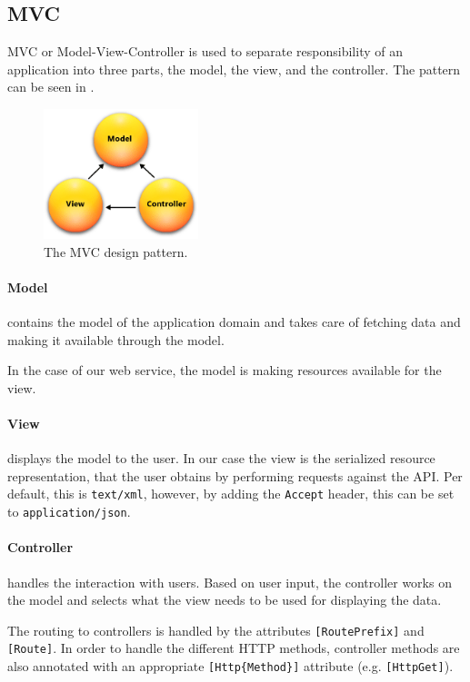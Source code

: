 \subsection{MVC} 
MVC or Model-View-Controller\cite{aspmvc} is used to separate responsibility of an application into three parts, the model, the view, and the controller.
The pattern can be seen in .

\begin{figure}[h]
\center
\includegraphics[width=0.4\textwidth]{graphics/mvc}
\caption{The MVC design pattern.\cite{aspmvc}}
\label{mvcdiagram}
\end{figure}

\paragraph{Model} contains the model of the application domain and takes care of fetching data and making it available through the model.

In the case of our web service, the model is making resources available for the view.

\paragraph{View} displays the model to the user.
In our case the view is the serialized resource representation, that the user obtains by performing requests against the API.
Per default, this is \texttt{text/xml}, however, by adding the \texttt{Accept} header, this can be set to \texttt{application/json}.\cite[Section 14]{http_specification}

\paragraph{Controller} handles the interaction with users.
Based on user input, the controller works on the model and selects what the view needs to be used for displaying the data.

The routing to controllers is handled by the attributes \texttt{[RoutePrefix]} and \texttt{[Route]}.
In order to handle the different HTTP methods, controller methods are also annotated with an appropriate \texttt{[Http\{Method\}]} attribute (e.g. \texttt{[HttpGet]}).\cite{asp_routing}